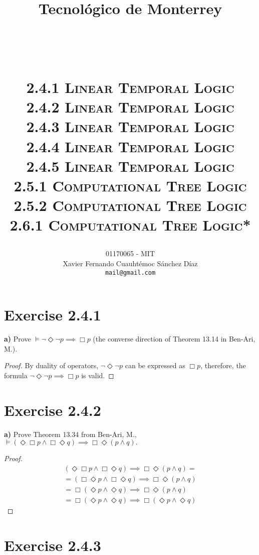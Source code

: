 \documentclass[titlepage, letterpaper, fleqn]{article}
\title{
\vspace{1in}
\textbf{Tecnológico de Monterrey} \\
\vspace{0.5in}
\textmd{\mahclass} \\
\large{\textit{\mahteacher}} \\
\vspace{0.5in}
\textsc{\mahtitle}\\
\textsc{2.4.1 Linear Temporal Logic}\\
\textsc{2.4.2 Linear Temporal Logic}\\
\textsc{2.4.3 Linear Temporal Logic}\\
\textsc{2.4.4 Linear Temporal Logic}\\
\textsc{2.4.5 Linear Temporal Logic}\\
\textsc{2.5.1 Computational Tree Logic}\\
\textsc{2.5.2 Computational Tree Logic}\\
\textsc{2.6.1 Computational Tree Logic*}\\
\author{01170065  - MIT \\
Xavier Fernando Cuauhtémoc Sánchez Díaz \\
\texttt{mail@gmail.com}}
\date{\mahdate}
}
\newcommand{\spacepls}{\vspace{5mm}}
\begin{document}
\begin{titlepage}
\maketitle
\end{titlepage}

%
%

\section{Exercise 2.4.1}

{\large \textbf{a)} Prove \(\models \neg \Diamond \neg p \implies \Box p\) (the converse direction of Theorem 13.14 in Ben-Ari, M.).}

\spacepls

\begin{proof}
By duality of operators, \(\neg \Diamond \neg p\) can be expressed as \(\Box p\), therefore, the formula \(\neg \Diamond \neg p \implies \Box p\) is valid.
\end{proof}

\section{Exercise 2.4.2}

{\large \textbf{a)} Prove Theorem 13.34 from Ben-Ari, M., \(\models (\Diamond \Box p \wedge \Box \Diamond q) \implies \Box \Diamond(p \wedge q).\)}

\spacepls

\begin{proof}
\begin{align*}
& (\Diamond \Box p \wedge \Box \Diamond q) \implies \Box \Diamond (p \wedge q) = &
\\ & = (\Box \Diamond p \wedge \Box \Diamond q) \implies \Box \Diamond (p \wedge q) & \tag*{Commutativity of $\Diamond \Box$}
\\ & = \Box (\Diamond p \wedge \Diamond q) \implies \Box \Diamond (p \wedge q) & \tag*{$\Box$ distributes over $\wedge$}
\\ & = \Box (\Diamond p \wedge \Diamond q) \implies \Box (\Diamond p \wedge \Diamond q) & \tag*{$\Diamond$ distributes over $\wedge$ in this direction}
\end{align*}
\end{proof}

\section{Exercise 2.4.3}
\end{document}
